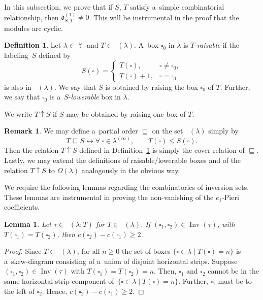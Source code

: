 \documentclass[pdftex]{sigma}
\numberwithin{equation}{section}
\newtheorem{Lemma}[Theorem]{Lemma}
\theoremstyle{definition}
\newtheorem{Definition}[Theorem]{Definition}
\newtheorem{Remark}[Theorem]{Remark}
\DeclareMathOperator{\Par}{\mathbb{Y}}
\DeclareMathOperator{\PSYT}{\mathrm{PSYT}_{\geq 0}}
\DeclareMathOperator{\RSSYT}{\mathrm{RSSYT}_{\geq 0}}
\DeclareMathOperator{\Inv}{\mathrm{Inv}}
\begin{document}
In this subsection, we prove that if $S$, $T$ satisfy a~simple combinatorial relationship, then $\mathfrak{d}_{S,T}^{(1)} \neq 0$. This will be instrumental in the proof that the modules  are cyclic.

\begin{Definition}\label{raising definition}
 Let $\lambda \in \Par$ and $T \in \RSSYT(\lambda)$. A~box $\square_0$ in $\lambda$ is $T$-\textit{\textit{raisable}} if the labeling~$S$ defined by
 \[
 S(\square) = \begin{cases}
 T(\square), & \square \neq \square_0, \\
 T(\square)+1 ,& \square = \square_0
 \end{cases}
 \]
 is also in $\RSSYT(\lambda)$. We say that $S$ is obtained by raising the box $\square_0$ of $T$. Further, we say that $\square_0$ is a~$S$-\textit{\textit{lowerable}} box in $\lambda$.

 We write $T \uparrow S$ if $S$ may be obtained by raising one box of $T$.
\end{Definition}

\begin{Remark}
 We may define a~partial order $\sqsubseteq$ on the set $\RSSYT(\lambda)$ simply by
 \[
 T \sqsubseteq S \leftrightarrow \forall ~\square \in \lambda^{(\infty)}, \qquad T(\square) \leq S(\square).
 \]
 Then the relation $T \uparrow S$ defined in Definition~\ref{raising definition} is simply the cover relation of $\sqsubseteq$.
 Lastly, we may extend the definitions of raisable/lowerable boxes and of the relation $T \uparrow S$ to $\Omega(\lambda)$ analogously in the obvious way.
\end{Remark}

We require the following lemmas regarding the combinatorics of inversion sets. These lemmas are instrumental in proving the non-vanishing of the $e_1$-Pieri coefficients.

\begin{Lemma}\label{gaps between contents}
 Let $\tau \in \PSYT(\lambda;T)$ for $T\in \RSSYT(\lambda)$. If $(\square_1,\square_2)\in \Inv(\tau)$, with $T(\square_1)=T(\square_2)$, then $c(\square_2)-c(\square_1) \geq 2$.
\end{Lemma}

\begin{proof}
 Since $T \in \RSSYT(\lambda)$, for all $n \geq 0$ the set of boxes $\{\square \in \lambda \mid T(\square) = n\}$ is a~skew-diagram consisting of a~union of disjoint horizontal strips. Suppose $(\square_1,\square_2) \in \Inv(\tau)$ with $T(\square_1)=T(\square_2) = n$. Then, $\square_1$ and $\square_2$ cannot be in the same horizontal strip component of~${\{\square \in \lambda \mid T(\square) = n\}}$. Further, $\square_1$ must be to the left of $\square_2$. Hence, $c(\square_2)-c(\square_1) \geq 2$.
\end{proof}
\end{document}
